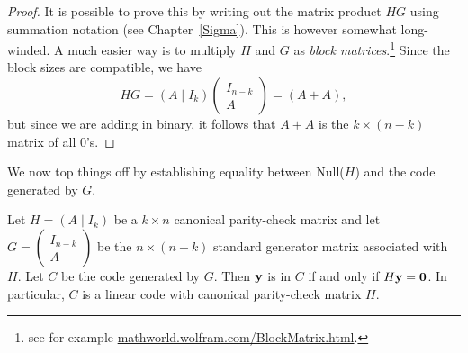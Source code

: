 \begin{proof}
It is possible to prove this by writing out the matrix product $HG$ using summation notation (see Chapter~\ref{Sigma}). This is however somewhat long-winded. A much easier way is to multiply $H$ and $G$ as \emph{block matrices}.\footnote{see for example \url{mathworld.wolfram.com/BlockMatrix.html}.} Since the block sizes are compatible, we have
\[ HG = (A \mid I_k )\left(
 \begin{array}{c}
 I_{n-k} \\
A
 \end{array} \right) = (A + A),\]
but since we are adding in binary, it follows that $A + A$ is the $k \times (n-k)$ matrix of all 0's.
\end{proof}
 
 We now top things off by establishing equality between Null($H$) and the code generated by $G$.
  
 \begin{prop}{}
Let $H = (A \mid I_k )$ be a $k \times n$ canonical parity-check
matrix and let $G = \left(
\begin{array}{c}
I_{n-k} \\
A
\end{array}  \right) $ be the $n
\times (n-k)$ standard generator matrix associated with $H$. Let $C$
be the code generated by $G$. Then ${\bold y}$ is in $C$ if and only
if $H {\bold y} = {\bold 0}$. In particular, $C$ is a linear code with
canonical parity-check matrix $H$. 
\end{prop}
 
